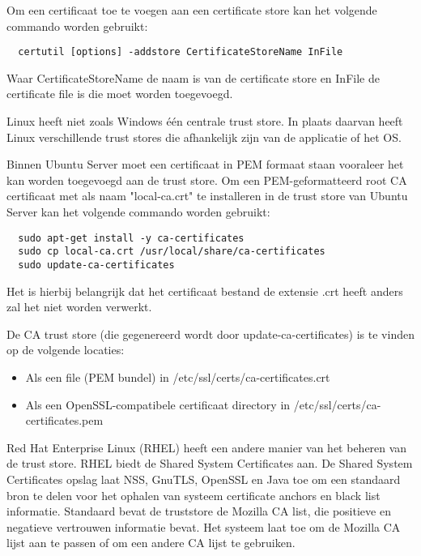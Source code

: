 Om een certificaat toe te voegen aan een certificate store kan het volgende commando worden gebruikt:
\begin{verbatim}
  certutil [options] -addstore CertificateStoreName InFile
\end{verbatim}
Waar CertificateStoreName de naam is van de certificate store en InFile de certificate file is die moet worden toegevoegd. \autocite{MScertutil}

Linux heeft niet zoals Windows één centrale trust store. In plaats daarvan heeft Linux verschillende trust stores die afhankelijk zijn van de applicatie of het OS.

Binnen Ubuntu Server moet een certificaat in PEM formaat staan vooraleer het kan worden toegevoegd aan de trust store.
Om een PEM-geformatteerd root CA certificaat met als naam "local-ca.crt" te installeren in de trust store van Ubuntu Server kan het volgende commando worden gebruikt:
\begin{verbatim}
  sudo apt-get install -y ca-certificates
  sudo cp local-ca.crt /usr/local/share/ca-certificates
  sudo update-ca-certificates
\end{verbatim}

Het is hierbij belangrijk dat het certificaat bestand de extensie .crt heeft anders zal het niet worden verwerkt.

De CA trust store (die gegenereerd wordt door update-ca-certificates) is te vinden op de volgende locaties:
\begin{itemize}
  \item Als een file (PEM bundel) in /etc/ssl/certs/ca-certificates.crt
  \item Als een OpenSSL-compatibele certificaat directory in /etc/ssl/certs/ca-certificates.pem
\end{itemize} \autocite{UbunTruststore}
\break

Red Hat Enterprise Linux (RHEL) heeft een andere manier van het beheren van de trust store. RHEL biedt de Shared System Certificates aan.
De Shared System Certificates opslag laat NSS, GnuTLS, OpenSSL en Java toe om een standaard bron te delen voor het ophalen van systeem certificate anchors en black list informatie.
Standaard bevat de truststore de Mozilla CA list, die positieve en negatieve vertrouwen informatie bevat. Het systeem laat toe om de Mozilla CA lijst aan te passen of om een andere CA lijst te gebruiken. \autocite{RHELtruststore} \break

